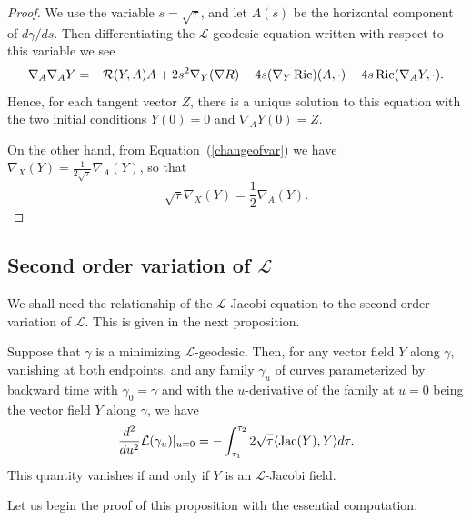 \begin{proof}
\sketch
{}
We use the variable $s=\sqrt{\tau}$, and let $A(s)$ be the
horizontal component of $d\gamma/ds$. Then differentiating the
${\mathcal L}$-geodesic equation written with respect to this
variable we see
$$\nabla_A\nabla_AY=-{\mathcal R}(Y,A)A+2s^2\nabla_Y(\nabla R)-4s(\nabla_Y\operatorname{Ric})(A,\cdot)
-4s\operatorname{Ric}(\nabla_AY,\cdot).$$ Hence, for each tangent vector $Z$,
there is a unique solution to this equation with the two initial
conditions $Y(0)=0$ and $\nabla_AY(0)=Z$.

On the other hand, from Equation~(\ref{changeofvar}) we have
$\nabla_X(Y)=\frac{1}{2\sqrt{\tau}}\nabla_A(Y)$, so that
$$\sqrt{\tau}\nabla_X(Y)=\frac{1}{2}\nabla_A(Y).$$
\end{proof}


\subsection{Second order variation of ${\mathcal
L}$} We shall need the relationship of the ${\mathcal L}$-Jacobi
equation to the second-order variation of ${\mathcal L}$. This is
given in the next proposition.




\begin{proposition}\label{prop:l-length-second-variation}
\label{2ndvarj}

Suppose that $\gamma$ is a minimizing ${\mathcal L}$-geodesic. Then,
for any vector field $Y$ along $\gamma$, vanishing at both
endpoints, and any family $\gamma_u$ of curves parameterized by
backward time with $\gamma_0=\gamma$ and with the $u$-derivative of
the family at $u=0$ being the vector field $Y$ along $\gamma$, we
have
$$\frac{d^2}{du^2}{\mathcal L}(\gamma_u)|_{u=0}=-\int_{\tau_1}^{\tau_2}2\sqrt{\tau}
\langle \operatorname{Jac}(Y),Y\rangle d\tau.$$ This quantity vanishes if and
only if $Y$ is an ${\mathcal L}$-Jacobi field.
\end{proposition}


Let us begin the proof of this proposition with the essential computation.


